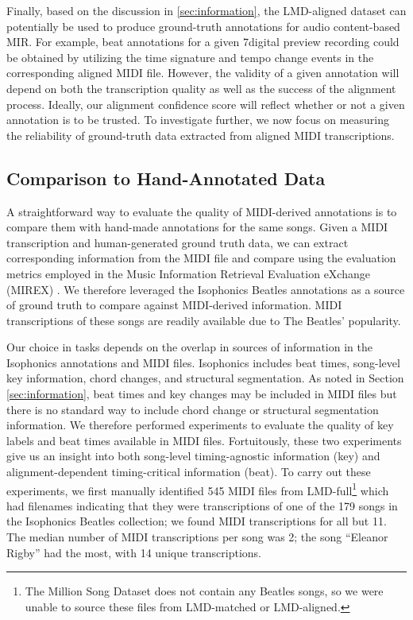 Finally, based on the discussion in \cref{sec:information}, the LMD-aligned dataset can potentially be used to produce ground-truth annotations for audio content-based MIR.
For example, beat annotations for a given 7digital preview recording could be obtained by utilizing the time signature and tempo change events in the corresponding aligned MIDI file.
However, the validity of a given annotation will depend on both the transcription quality as well as the success of the alignment process.
Ideally, our alignment confidence score will reflect whether or not a given annotation is to be trusted.
To investigate further, we now focus on measuring the reliability of ground-truth data extracted from aligned MIDI transcriptions.

\subsection{Comparison to Hand-Annotated Data}
\label{sec:reliability}

A straightforward way to evaluate the quality of MIDI-derived annotations is to compare them with hand-made annotations for the same songs.
Given a MIDI transcription and human-generated ground truth data, we can extract corresponding information from the MIDI file and compare using the evaluation metrics employed in the Music Information Retrieval Evaluation eXchange (MIREX) \cite{downie2008music}.
We therefore leveraged the Isophonics Beatles annotations \cite{mauch2009omras2} as a source of ground truth to compare against MIDI-derived information.  MIDI transcriptions of these songs are readily available due to The Beatles' popularity.

Our choice in tasks depends on the overlap in sources of information in the Isophonics annotations and MIDI files.
Isophonics includes beat times, song-level key information, chord changes, and structural segmentation.
As noted in Section \ref{sec:information}, beat times and key changes may be included in MIDI files but there is no standard way to include chord change or structural segmentation information.
We therefore performed experiments to evaluate the quality of key labels and beat times available in MIDI files.
Fortuitously, these two experiments give us an insight into both song-level timing-agnostic information (key) and alignment-dependent timing-critical information (beat).
To carry out these experiments, we first manually identified 545 MIDI files from LMD-full\footnote{The Million Song Dataset does not contain any Beatles songs, so we were unable to source these files from LMD-matched or LMD-aligned.} which had filenames indicating that they were transcriptions of one of the 179 songs in the Isophonics Beatles collection; we found MIDI transcriptions for all but 11.
The median number of MIDI transcriptions per song was 2; the song ``Eleanor Rigby'' had the most, with 14 unique transcriptions.

